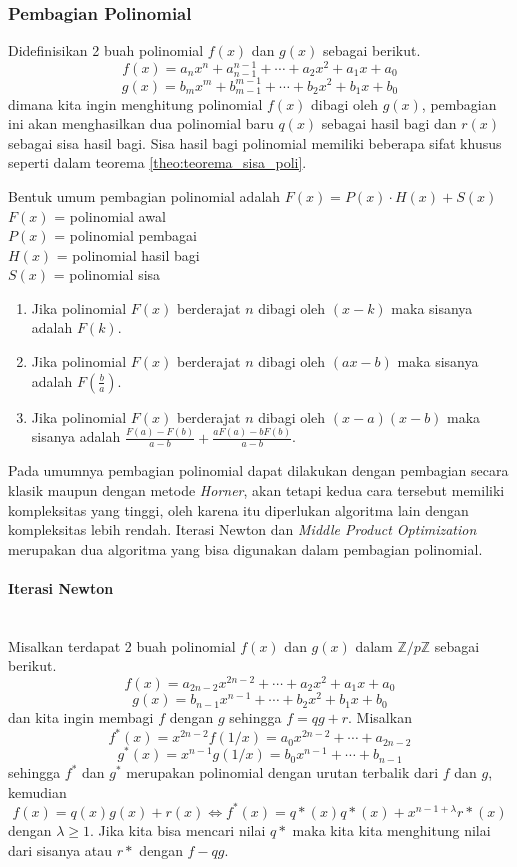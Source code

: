 \subsubsection{Pembagian Polinomial}
Didefinisikan 2 buah polinomial $f(x)$ dan $g(x)$ sebagai berikut.
$$ f(x) = a_n x^n + a_{n-1}^{n-1} + \cdots + a_2x^2 + a_1x + a_0 $$
$$ g(x) = b_m x^m + b_{m-1}^{m-1} + \cdots + b_2x^2 + b_1x + b_0 $$
dimana kita ingin menghitung polinomial $ f(x) $ dibagi oleh $ g(x) $, pembagian ini akan menghasilkan dua polinomial baru $ q(x) $ sebagai hasil bagi dan $ r(x) $ sebagai sisa hasil bagi. Sisa hasil bagi polinomial memiliki beberapa sifat khusus seperti dalam teorema \ref{theo:teorema_sisa_poli}.
\begin{theo}
	\label{theo:teorema_sisa_poli}
	Bentuk umum pembagian polinomial adalah $ F(x) = P(x) \cdot H(x) + S(x) $ \\
	$ F(x) $ = polinomial awal \\
	$ P(x) $ = polinomial pembagai \\
	$ H(x) $ = polinomial hasil bagi \\
	$ S(x) $ = polinomial sisa \\
	\begin{enumerate}
		\item Jika polinomial $ F(x) $ berderajat $ n $ dibagi oleh $ (x - k) $ maka sisanya adalah $ F(k) $.
		\item Jika polinomial $ F(x) $ berderajat $ n $ dibagi oleh $ (ax - b) $ maka sisanya adalah $ F(\frac{b}{a}) $.
		\item Jika polinomial $ F(x) $ berderajat $ n $ dibagi oleh $ (x - a)(x - b) $ maka sisanya adalah $ \frac{F(a) - F(b)}{a - b} +  \frac{aF(a) - bF(b)}{a - b}$.
	\end{enumerate}
\end{theo}
Pada umumnya pembagian polinomial dapat dilakukan dengan pembagian secara klasik maupun dengan metode \textit{Horner}, akan tetapi kedua cara tersebut memiliki kompleksitas yang tinggi, oleh karena itu diperlukan algoritma lain dengan kompleksitas lebih rendah. Iterasi Newton dan \textit{Middle Product Optimization} merupakan dua algoritma yang bisa digunakan dalam pembagian polinomial.

\paragraph{Iterasi Newton}\mbox{}\\
\indent Misalkan terdapat 2 buah polinomial $f(x)$ dan $g(x)$ dalam $ \mathbb{Z}/p\mathbb{Z} $ sebagai berikut.
$$ f(x) = a_{2n-2} x^{2n-2} + \cdots + a_2x^2 + a_1x + a_0 $$
$$ g(x) = b_{n-1} x^{n-1} + \cdots + b_2x^2 + b_1x + b_0 $$
dan kita ingin membagi $ f $ dengan $ g $ sehingga $ f = qg + r $.
Misalkan 
$$ f^*(x) = x^{2n-2}f(1/x) = a_0 x^{2n-2} + \cdots + a_{2n-2} $$
$$ g^*(x) = x^{n-1}g(1/x) = b_0 x^{n-1} + \cdots + b_{n-1} $$
sehingga $ f^* $ dan $ g^* $ merupakan polinomial dengan urutan terbalik dari $ f $ dan $ g $, kemudian
$$  f(x) = q(x)g(x) + r(x) \iff f^*(x) = q*(x) q*(x) + x^{n-1+\lambda} r*(x) $$
dengan $ \lambda \geq 1 $. Jika kita bisa mencari nilai $ q* $ maka kita kita menghitung nilai dari sisanya atau $ r* $ dengan $ f-qg $.

